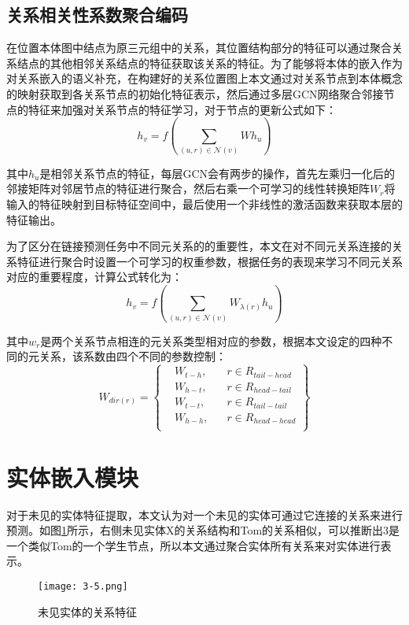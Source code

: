 \subsection{关系相关性系数聚合编码}
在位置本体图中结点为原三元组中的关系，其位置结构部分的特征可以通过聚合关系结点的其他相邻关系结点的特征获取该关系的特征。为了能够将本体的嵌入作为对关系嵌入的语义补充，在构建好的关系位置图上本文通过对关系节点到本体概念的映射获取到各关系节点的初始化特征表示，然后通过多层GCN网络聚合邻接节点的特征来加强对关系节点的特征学习，对于节点的更新公式如下：
\begin{equation}
  h_{v} = f\left( \sum_{(u,r) \in \mathcal{N}(v)} W h_{u}\right) \label{eq:3-8}
\end{equation}

其中\(h_{u}\)是相邻关系节点的特征，每层GCN会有两步的操作，首先左乘归一化后的邻接矩阵对邻居节点的特征进行聚合，然后右乘一个可学习的线性转换矩阵\(W_{r}\)将输入的特征映射到目标特征空间中，最后使用一个非线性的激活函数来获取本层的特征输出。

为了区分在链接预测任务中不同元关系的的重要性，本文在对不同元关系连接的关系特征进行聚合时设置一个可学习的权重参数，根据任务的表现来学习不同元关系对应的重要程度，计算公式转化为：
\begin{equation}
  h_{v} = f\left( \sum_{(u,r) \in \mathcal{N}(v)} W_{ \lambda(r) } h_{u}\right) \label{eq:3-9}
\end{equation}

其中\(w_{r}\)是两个关系节点相连的元关系类型相对应的参数，根据本文设定的四种不同的元关系，该系数由四个不同的参数控制：
\begin{equation}
  W_{dir(r)} = \left\{ \begin{array}{rcl}
    &W_{t-h}  \mbox{,} &\quad r \in R_{tail-head} \\
    &W_{h-t}  \mbox{,} &\quad  r \in R_{head-tail} \\
    &W_{t-t}  \mbox{,} &\quad  r \in R_{tail-tail} \\
    &W_{h-h}  \mbox{,} &\quad  r \in R_{head-head} \\
    \end{array}\right\} \label{eq:3-10}
\end{equation}

\section{实体嵌入模块}
对于未见的实体特征提取，本文认为对一个未见的实体可通过它连接的关系来进行预测。如图\ref{fig:3-5}所示，右侧未见实体X的关系结构和Tom的关系相似，可以推断出3是一个类似Tom的一个学生节点，所以本文通过聚合实体所有关系来对实体进行表示。
\begin{figure}[h]
  \centering
  \texttt{[image: 3-5.png]}
  \caption{未见实体的关系特征}
  \label{fig:3-5}
\end{figure}

